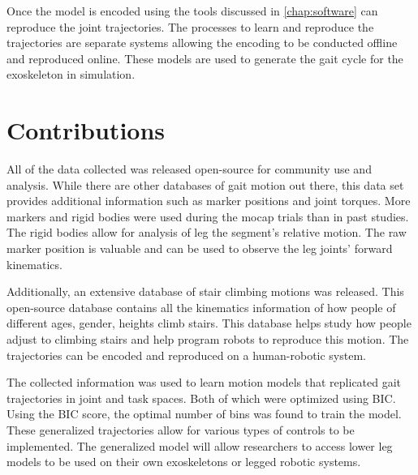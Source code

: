 Once the model is encoded using the tools discussed in \autoref{chap:software} can reproduce the joint trajectories. The processes to learn and reproduce the trajectories are separate systems allowing the encoding to be conducted offline and reproduced online. These models are used to generate the gait cycle for the exoskeleton in simulation. 


\section{Contributions}

All of the data collected was released open-source for community use and analysis. While there are other databases of gait motion out there, this data set provides additional information such as marker positions and joint torques. More markers and rigid bodies were used during the mocap trials than in past studies. The rigid bodies allow for analysis of leg the segment's relative motion. The raw marker position is valuable and can be used to observe the leg joints' forward kinematics. 

Additionally, an extensive database of stair climbing motions was released. This open-source database contains all the kinematics information of how people of different ages, gender, heights climb stairs. This database helps study how people adjust to climbing stairs and help program robots to reproduce this motion. The trajectories can be encoded and reproduced on a human-robotic system. 

The collected information was used to learn motion models that replicated gait trajectories in joint and task spaces. Both of which were optimized using BIC. Using the BIC score, the optimal number of bins was found to train the model. These generalized trajectories allow for various types of controls to be implemented. The generalized model will allow researchers to access lower leg models to be used on their own exoskeletons or legged robotic systems. 